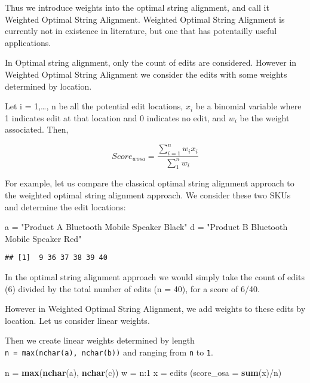 \documentclass[]{article}
\newenvironment{Shaded}{\begin{snugshade}}{\end{snugshade}}
\newcommand{\KeywordTok}[1]{\textcolor[rgb]{0.13,0.29,0.53}{\textbf{{#1}}}}
\newcommand{\DataTypeTok}[1]{\textcolor[rgb]{0.13,0.29,0.53}{{#1}}}
\newcommand{\DecValTok}[1]{\textcolor[rgb]{0.00,0.00,0.81}{{#1}}}
\newcommand{\StringTok}[1]{\textcolor[rgb]{0.31,0.60,0.02}{{#1}}}
\newcommand{\NormalTok}[1]{{#1}}
\begin{document}
Thus we introduce weights into the optimal string alignment, and call it
Weighted Optimal String Alignment. Weighted Optimal String Alignment is
currently not in existence in literature, but one that has potentailly
useful applications.

In Optimal string alignment, only the count of edits are considered.
However in Weighted Optimal String Alignment we consider the edits with
some weights determined by location.

Let i = 1,\ldots{}, n be all the potential edit locations, \(x_{i}\) be
a binomial variable where 1 indicates edit at that location and 0
indicates no edit, and \(w_{i}\) be the weight associated. Then,

\[
Score_{wosa} = \frac{\sum_{i=1}^{n} w_{i} x_{i}}{\sum_{1}^{n} w_{i}}
\]

For example, let us compare the classical optimal string alignment
approach to the weighted optimal string alignment approach. We consider
these two SKUs and determine the edit locations:

\begin{Shaded}
\begin{Highlighting}[]
\NormalTok{a =}\StringTok{ "Product A Bluetooth Mobile Speaker Black"}
\NormalTok{d =}\StringTok{ "Product B Bluetooth Mobile Speaker Red"}
\end{Highlighting}
\end{Shaded}

\begin{verbatim}
## [1]  9 36 37 38 39 40
\end{verbatim}

In the optimal string alignment approach we would simply take the count
of edits (6) divided by the total number of edits (n = 40), for a score
of 6/40.

However in Weighted Optimal String Alignment, we add weights to these
edits by location. Let us consider linear weights.

Then we create linear weights determined by length
\texttt{n\ =\ max(nchar(a),\ nchar(b))} and ranging from \texttt{n} to
\texttt{1}.

\begin{Shaded}
\begin{Highlighting}[]
\NormalTok{n =}\StringTok{ }\KeywordTok{max}\NormalTok{(}\KeywordTok{nchar}\NormalTok{(a), }\KeywordTok{nchar}\NormalTok{(c))}
\NormalTok{w =}\StringTok{ }\NormalTok{n:}\DecValTok{1}
\NormalTok{x =}\StringTok{ }\NormalTok{edits  }
\NormalTok{(}\DataTypeTok{score_osa =} \KeywordTok{sum}\NormalTok{(x)/n)}
\end{Highlighting}
\end{Shaded}
\end{document}
